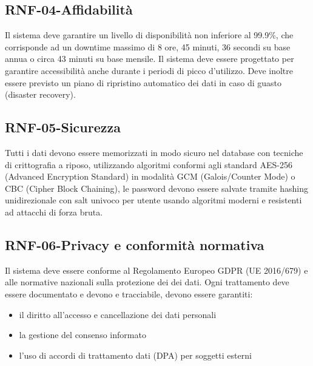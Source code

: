 \subsection*{RNF-04-Affidabilità}
Il sistema deve garantire un livello di disponibilità non inferiore al 99.9\%,
che corrisponde ad un downtime massimo di 8 ore, 45 minuti, 36 secondi su base annua o circa 43 minuti su base mensile.
Il sistema deve essere progettato per garantire accessibilità anche durante i
periodi di picco d'utilizzo. Deve inoltre essere previsto un piano di ripristino
automatico dei dati in caso di guasto (disaster recovery).
\subsection*{RNF-05-Sicurezza}
Tutti i dati devono essere memorizzati in modo sicuro nel database con tecniche di
crittografia a riposo, utilizzando algoritmi conformi agli standard AES-256
(Advanced Encryption Standard) in modalità GCM (Galois/Counter Mode)
o CBC (Cipher Block Chaining), le password devono essere salvate tramite hashing
unidirezionale con salt univoco per utente usando algoritmi moderni e
resistenti ad attacchi di forza bruta.
\subsection*{RNF-06-Privacy e conformità normativa}
Il sistema deve essere conforme al Regolamento Europeo GDPR
(UE 2016/679) e alle normative nazionali sulla protezione dei
dei dati. Ogni trattamento deve essere documentato e devono
e tracciabile, devono essere garantiti:
\begin{itemize}
    \item il diritto all'accesso e cancellazione dei dati personali
    \item la gestione del consenso informato
    \item l'uso di accordi di trattamento dati (DPA) per soggetti esterni
\end{itemize}

